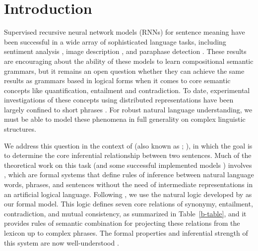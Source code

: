 \section{Introduction}\label{sec:intro}

Supervised recursive neural network models (RNNs) for sentence meaning
have been successful in a wide array of sophisticated language tasks,
including sentiment analysis \cite{socher2011semi,socher2013acl1},
image description \cite{sochergrounded}, and paraphase detection
\cite{Socher-etal:2011:Paraphrase}. These results are encouraging
about the ability of these models to learn compositional semantic
grammars, but it remains an open question whether they can achieve the
same results as grammars based in logical forms
\cite{ZetCol:2005,LiangJordan:2013} when it comes to core semantic
concepts like quantification, entailment and contradiction. To date,
experimental investigations of these concepts using distributed
representations have been largely confined to short phrases
\cite{Mitchell:Lapata:2010,Grefenstette-etal:2011,baroni2012entailment,kalchbrenner2014convolutional}.
For robust natural language understanding, we must be able to model
these phenomena in full generality on complex linguistic structures.

We address this question in the context of  (also known as ;
\cite{dagan2006pascal}), in which the goal is to determine the core
inferential relationship between two sentences. Much of the
theoretical work on this task (and some successful implemented models
\cite{maccartney2009natural,watanabe2012latent}) involves , which are formal systems that define rules of inference
between natural language words, phrases, and sentences without the
need of intermediate representations in an artificial logical
language. Following \cite{bowman2013can}, we use the natural logic
developed by \cite{maccartney2009extended} as our formal model. This
logic defines seven core relations of synonymy, entailment,
contradiction, and mutual consistency, as summarized in
Table~\ref{b-table}, and it provides rules of semantic combination for
projecting these relations from the lexicon up to complex phrases. The
formal properties and inferential strength of this system are now
well-understood \cite{Icard:Moss:2013,Icard:Moss:2013:LILT}.

